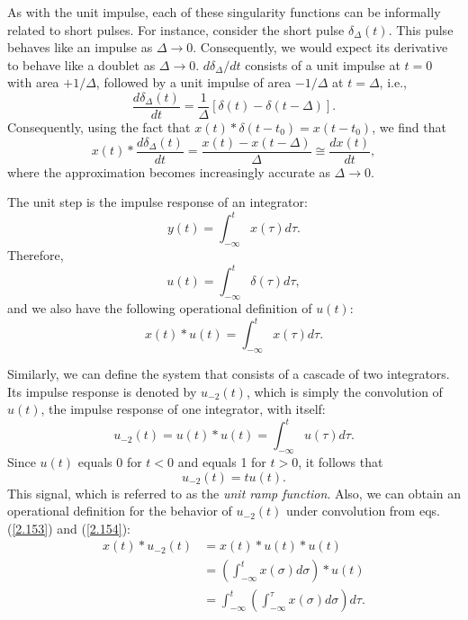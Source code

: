 \documentclass[a4paper,10pt,twoside]{book}
\begin{document}
As with the unit impulse, each of these singularity functions can be informally related to short pulses. For instance, consider the short pulse $\delta_\Delta(t)$. This pulse behaves like an impulse as $\Delta\to 0$. Consequently, we would expect its derivative to behave like a doublet as $\Delta\to 0$. $d\delta_\Delta/dt$ consists of a unit impulse at $t=0$ with area $+1/\Delta$, followed by a unit impulse of area $-1/\Delta$ at $t=\Delta$, i.e.,
\begin{equation}
    \frac{d\delta_\Delta(t)}{dt}=\frac1\Delta[\delta(t)-\delta(t-\Delta)].
    \label{2.150}
\end{equation}
Consequently, using the fact that $x(t)*\delta(t-t_0)=x(t-t_0)$, we find that
\begin{equation}
    x(t)*\frac{d\delta_\Delta(t)}{dt}=\frac{x(t)-x(t-\Delta)}\Delta\cong\frac{dx(t)}{dt},
    \label{2.151}
\end{equation}
where the approximation becomes increasingly accurate as $\Delta\to 0$.

The unit step is the impulse response of an integrator: $$y(t)=\int_{-\infty}^tx(\tau) d\tau.$$ Therefore,
\begin{equation}
    u(t)=\int_{-\infty}^t\delta(\tau) d\tau,
    \label{2.152}
\end{equation}
and we also have the following operational definition of $u(t)$:
\begin{equation}
    x(t)*u(t)=\int_{-\infty}^tx(\tau) d\tau.
    \label{2.153}
\end{equation}

Similarly, we can define the system that consists of a cascade of two integrators. Its impulse response is denoted by $u_{-2}(t)$, which is simply the convolution of $u(t)$, the impulse response of one integrator, with itself:
\begin{equation}
    u_{-2}(t) = u(t)*u(t) = \int_{-\infty}^{t}u(\tau) d\tau.
    \label{2.154}
\end{equation}
Since $u(t)$ equals 0 for $t<0$ and equals 1 for $t>0$, it follows that
\begin{equation}
    u_{-2}(t)=tu(t).
    \label{2.155}
\end{equation}
This signal, which is referred to as the \textit{unit ramp function}. Also, we can obtain an operational definition for the behavior of $u_{-2}(t)$ under convolution from eqs.\;(\ref{2.153}) and (\ref{2.154}):
\begin{equation}
    \begin{aligned}x(t)*u_{-2}(t)&= x(t)*u(t)*u(t)\\&=\left(\int_{-\infty}^{t}x(\sigma) d\sigma\right)*u(t)\\&=\int_{-\infty}^{t}\left(\int_{-\infty}^{\tau}x(\sigma) d\sigma\right)d\tau.\end{aligned}
    \label{2.156}
\end{equation}
\end{document}
